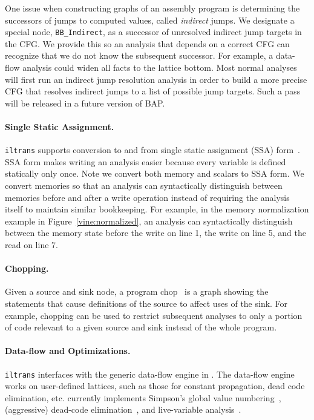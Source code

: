 One issue when constructing graphs of an assembly program is
determining the successors of jumps to computed values, called {\it
  indirect} jumps. We designate a special node, {\tt BB\_Indirect}, as
a successor of unresolved indirect jump targets in the CFG.  We
provide this so an analysis that depends on a correct CFG can
recognize that we do not know the subsequent successor. For example, a
data-flow analysis could widen all facts to the lattice bottom.  Most
normal analyses will first run an indirect jump resolution analysis in
order to build a more precise CFG that resolves indirect jumps to a
list of possible jump targets.  Such a pass will be released in a
future version of BAP.

\paragraph{Single Static Assignment.} {\tt iltrans} supports
conversion to and from single static assignment (SSA)
form~\cite{muchnick:1997}. SSA form makes writing an analysis easier
because every variable is defined statically only once.  Note we
convert both memory and scalars to SSA form. We convert memories so
that an analysis can syntactically distinguish between memories before
and after a write operation instead of requiring the analysis itself
to maintain similar bookkeeping. For example, in the memory
normalization example in Figure~\ref{vine:normalized}, an analysis can
syntactically distinguish between the memory state before the write on
line 1, the write on line 5, and the read on line 7.

\paragraph{Chopping.}  Given a source and sink node, a program
chop~\cite{jackson:1994} is a graph showing the statements that cause
definitions of the source to affect uses of the sink.  For example,
chopping can be used to restrict subsequent analyses to only a portion
of code relevant to a given source and sink instead of the whole
program. %

\paragraph{Data-flow and Optimizations.} {\tt iltrans} interfaces with
the generic data-flow engine in \bap.  The data-flow engine works on
user-defined lattices, such as those for constant propagation, dead
code elimination, etc.  \bap currently implements
Simpson's global value numbering~\cite{simpson:1996}, (aggressive)
dead-code elimination~\cite{muchnick:1997}, and live-variable
analysis~\cite{muchnick:1997}.

